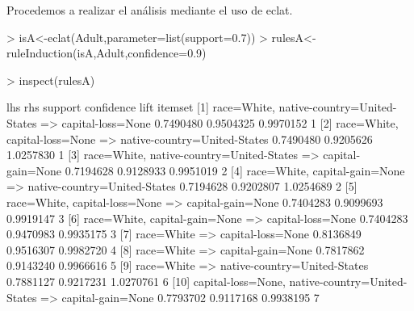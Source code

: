 \documentclass [a4paper] {article}
\begin{document}
{\bigskip
Procedemos a realizar el análisis mediante el uso de eclat.
\begin{Schunk}
\begin{Sinput}
> isA<-eclat(Adult,parameter=list(support=0.7))
> rulesA<-ruleInduction(isA,Adult,confidence=0.9)
\end{Sinput}
\end{Schunk}

\scriptsize
\begin{Schunk}
\begin{Sinput}
> inspect(rulesA)
\end{Sinput}
\begin{Soutput}
     lhs                               rhs                              support confidence      lift itemset
[1]  {race=White,                                                                                           
      native-country=United-States} => {capital-loss=None}            0.7490480  0.9504325 0.9970152       1
[2]  {race=White,                                                                                           
      capital-loss=None}            => {native-country=United-States} 0.7490480  0.9205626 1.0257830       1
[3]  {race=White,                                                                                           
      native-country=United-States} => {capital-gain=None}            0.7194628  0.9128933 0.9951019       2
[4]  {race=White,                                                                                           
      capital-gain=None}            => {native-country=United-States} 0.7194628  0.9202807 1.0254689       2
[5]  {race=White,                                                                                           
      capital-loss=None}            => {capital-gain=None}            0.7404283  0.9099693 0.9919147       3
[6]  {race=White,                                                                                           
      capital-gain=None}            => {capital-loss=None}            0.7404283  0.9470983 0.9935175       3
[7]  {race=White}                   => {capital-loss=None}            0.8136849  0.9516307 0.9982720       4
[8]  {race=White}                   => {capital-gain=None}            0.7817862  0.9143240 0.9966616       5
[9]  {race=White}                   => {native-country=United-States} 0.7881127  0.9217231 1.0270761       6
[10] {capital-loss=None,                                                                                    
      native-country=United-States} => {capital-gain=None}            0.7793702  0.9117168 0.9938195       7

\end{Soutput}
\end{Schunk}}
\end{document}

